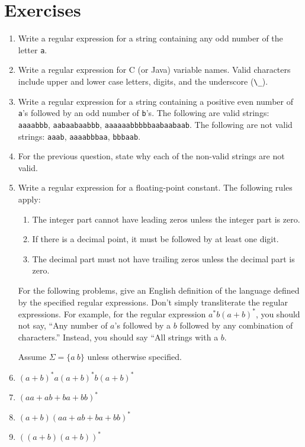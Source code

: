 \documentclass[letterpaper,12pt,openany,reqno]{book}%
\newcommand{\code}[1] {\lstinline[breaklines=yes,breakatwhitespace=yes]{#1}}
\begin{document}
\section{Exercises}
\begin{enumerate}
\item Write a regular expression for a string containing any odd number of the letter \code{a}.
\item Write a regular expression for C (or Java) variable names. Valid characters include upper and lower case letters, digits, and the underscore (\code{\_}).
\item Write a regular expression for a string containing a positive even number of \code{a}'s followed by an odd number of \code{b}'s. The following are valid strings: \code{aaaabbb}, \code{aabaabaabbb}, \code{aaaaaabbbbbaabaabaab}. The following are not valid strings: \code{aaab}, \code{aaaabbbaa}, \code{bbbaab}.
\item For the previous question, state why each of the non-valid strings are not valid.
\item Write a regular expression for a floating-point constant. The following rules apply: 
\begin{enumerate}
\item The integer part cannot have leading zeros unless the integer part is zero. 
\item If there is a decimal point, it must be followed by at least one digit.
\item The decimal part must not have trailing zeros unless the decimal part is zero.
\end{enumerate}
For the following problems, give an English definition of the language defined by the specified regular expressions. Don't simply transliterate the regular expressions. For example, for the regular expression $a^*b(a+b)^*$, you should not say, ``Any number of $a$'s followed by a $b$ followed by any combination of characters.'' Instead, you should say ``All strings with a $b$.

Assume $\Sigma = \{a\ b\}$ unless otherwise specified.

\item $(a+b)^*a(a+b)^*b(a+b)^*$
\item $(aa + ab + ba + bb)^*$
\item $(a+b)(aa + ab + ba + bb)^*$
\item $((a+b)(a+b))^*$
\end{enumerate}
\end{document}
